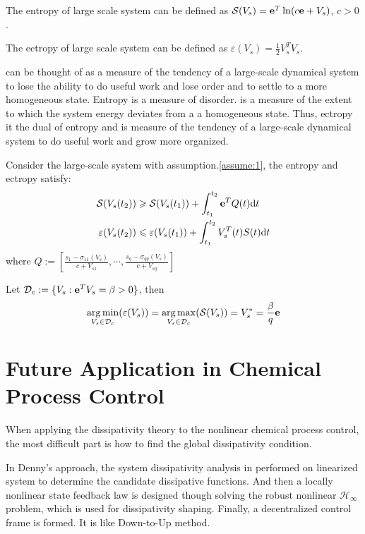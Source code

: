 \documentclass{paper}
\begin{document}
\begin{defi}
The entropy of large scale system can be defined as $\mathcal{S}(V_s)=\textbf{e}^T\ln (c\textbf{e}+V_s)$, $c>0$.
\end{defi}
\begin{defi}
The ectropy of large scale system can be defined as $\varepsilon(V_s)=\frac{1}{2}V_s^TV_s$.
\end{defi}
\begin{note}
 can be thought of as a measure of the tendency of a large-scale dynamical system to lose the
ability to do useful work and lose order and to settle to a more homogeneous state. Entropy is a measure of
disorder.  is a measure of the extent to which the system energy deviates from a a homogeneous 
state. Thus, ectropy it the dual of entropy and is measure of the tendency of a large-scale dynamical system 
to do useful work and grow more organized.
\end{note}
\begin{thm}
Consider the large-scale system with assumption.\ref{assume:1}, the entropy and ectropy satisfy:
\begin{align}
\mathcal{S}(V_s(t_2))&\geqslant \mathcal{S}(V_s(t_1))+\int_{t_1}^{t_2}\textbf{e}^TQ(t)\text{d} t \\
\varepsilon(V_s(t_2))&\leqslant\varepsilon(V_s(t_1))+\int_{t_1}^{t_2}V_s^T(t)S(t)\text{d} t
\end{align}
where $Q:=\left[\frac{s_1-\sigma_{11}(V_s)}{c+V_{s1}},\cdots,\frac{s_q-\sigma_{qq}(V_s)}{c+V_{sq}}\right]$
\end{thm}
\begin{lem}
Let $\mathcal{D}_c:=\{V_s:\textbf{e}^TV_s=\beta>0\}$, then 
\begin{equation}
\underset{V_s\in\mathcal{D}_c}{\arg\min}(\varepsilon(V_s))=\underset{V_s\in\mathcal{D}_c}{\arg\max}(\mathcal{S}(V_s))=V_s^*=\frac{\beta}{q}\textbf{e}
\end{equation}
\end{lem}
\section{Future Application in Chemical Process Control}
When applying the dissipativity theory to the nonlinear chemical process control, the most difficult part is
how to find the global dissipativity condition.  

In Denny's approach, the system dissipativity analysis in performed on linearized system to determine the candidate 
dissipative functions. And then a locally nonlinear state feedback law is designed though solving the robust nonlinear 
$\mathcal{H}_\infty$ problem, which is used for dissipativity shaping. Finally, a decentralized control frame is formed. 
It is like Down-to-Up method. 
\end{document}
